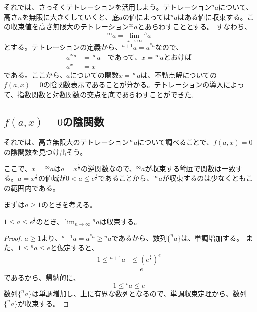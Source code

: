 	それでは、さっそくテトレーションを活用しよう。テトレーション$^n a$について、高さ$n$を無限に大きくしていくと、底$a$の値によっては$^n a$はある値に収束する。この収束値を高さ無限大のテトレーション$^\infty a$とあらわすこととする。
	すなわち、
	\begin{equation*}
		^\infty a = \lim_{h \to \infty} {^h a}
	\end{equation*}
	とする。テトレーションの定義から、$^{h+1} a = a^{^h a}$なので、
	\begin{align*}
		a ^{^\infty a} &= {^\infty a} \quad \text{であって、$x = {^\infty a}$とおけば} \\
		a^x &= x
	\end{align*}
	である。ここから、$a$についての関数$x = {^\infty a}$は、不動点解についての$f(a,x) = 0$の陰関数表示であることが分かる。テトレーションの導入によって、指数関数と対数関数の交点を底であらわすことができた。
	
\subsection{$f(a,x)=0$の陰関数}
	それでは、高さ無限大のテトレーション$^\infty a$について調べることで、$f(a,x)=0$の陰関数を見つけ出そう。
	
	ここで、$x = {^\infty a}$は$a = x^\frac{1}{x}$の逆関数なので、${^\infty a}$が収束する範囲で関数は一致する。$a = x^\frac{1}{x}$の値域が$0 < a \leq e^\frac{1}{e}$であることから、${^\infty a}$が収束するのは少なくともこの範囲内である。
	
	まずは$a \geq 1$のときを考える。
	\begin{theorem}
	\label{th:tetration_convergence_a_greater_1}
		$1 \leq a \leq e^\frac{1}{e}$のとき、$\displaystyle \lim_{n \to \infty} {^n a}$は収束する。
	\end{theorem}
	\begin{proof}
	
		$a \geq 1$より、$^{n+1} a = a ^{^n a} \geq {^n a}$であるから、数列$\{^n a\}$は、単調増加する。
		また、$1 \leq {^n a} \leq e$と仮定すると、
		\begin{align*}
			1 \leq {^{n+1} a} &\leq (e^\frac{1}{e})^e \\
							  &= e
		\end{align*}
		であるから、帰納的に、
		\begin{equation*}
			1 \leq {^n a} \leq e
		\end{equation*}
		数列$\{^n a\}$は単調増加し、上に有界な数列となるので、単調収束定理から、数列$\{^n a\}$が収束する。
	\end{proof}
	
